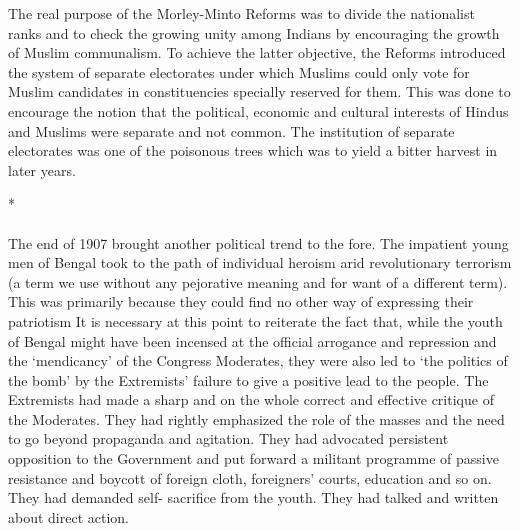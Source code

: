 The real purpose of the Morley-Minto Reforms was to divide the nationalist ranks and to check the growing unity among Indians by encouraging the growth of Muslim communalism. To achieve the latter objective, the Reforms introduced the system of separate electorates under which Muslims could only vote for Muslim candidates in constituencies specially reserved for them. This was done to encourage the notion that the political, economic and cultural interests of Hindus and Muslims were separate and not common. The institution of separate electorates was one of the poisonous trees which was to yield a bitter harvest in later years.

\begin{center}*\end{center}

\paragraph*{}

The end of 1907 brought another political trend to the fore. The impatient young men of Bengal took to the path of individual heroism arid revolutionary terrorism (a term we use without any pejorative meaning and for want of a different term). This was primarily because they could find no other way of expressing their patriotism It is necessary at this point to reiterate the fact that, while the youth of Bengal might have been incensed at the official arrogance and repression and the `mendicancy' of the Congress Moderates, they were also led to `the politics of the bomb' by the Extremists' failure to give a positive lead to the people. The Extremists had made a sharp and on the whole correct and effective critique of the Moderates. They had rightly emphasized the role of the masses and the need to go beyond propaganda and agitation. They had advocated persistent opposition to the Government and put forward a militant programme of passive resistance and boycott of foreign cloth, foreigners' courts, education and so on. They had demanded self- sacrifice from the youth. They had talked and written about direct action.

